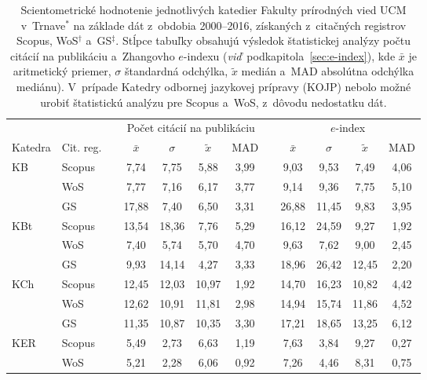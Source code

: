 \begin{table}
  \centering\small
  \caption[Hodnotenie FPV -- počet citácií na publikáciu a~$e$-index]%
  {Scientometrické hodnotenie jednotlivých katedier Fakulty prírodných vied UCM
    v~Trnave$^\ast$ na základe dát z~obdobia 2000--2016, získaných z~citačných
    registrov Scopus, WoS$^\dagger$ a~GS$^\ddagger$.  Stĺpce tabuľky obsahujú
    výsledok štatistickej analýzy počtu citácií na publikáciu a~Zhangovho
    $e$-indexu (\emph{viď}~podkapitola~\ref{sec:e-index}), kde $\bar{x}$ je
    aritmetický priemer, $\sigma$ štandardná odchýlka, $\tilde{x}$ medián a~MAD
    absolútna odchýlka mediánu).  V~prípade Katedry odbornej jazykovej prípravy
    (KOJP) nebolo možné urobiť štatistickú analýzu pre Scopus a~WoS, z~dôvodu
    nedostatku dát.}
  \label{tab:2-staff.results}
  \begin{tabularx}{\textwidth}{XXp{1ex}ccccp{1ex}cccc}
    \toprule
    & & &\multicolumn{4}{c}{Počet citácií na publikáciu} & &\multicolumn{4}{c}{$e$-index} \\
    \cmidrule{4-7}\cmidrule{9-12}
    Katedra  & Cit. reg. & & $\bar{x}$ & $\sigma$  & $\tilde{x}$ & MAD & & $\bar{x}$ & $\sigma$ & $\tilde{x}$  & MAD \\
    \midrule
    KB   & Scopus & & 7,74  & 7,75  & 5,88  & 3,99  & & 9,03  & 9,53  & 7,49  & 4,06  \\
         & WoS    & & 7,77  & 7,16  & 6,17  & 3,77  & & 9,14  & 9,36  & 7,75  & 5,10  \\
         & GS     & & 17,88 & 7,40  & 6,50  & 3,31  & & 26,88 & 11,45 & 9,83  & 3,95  \\[1ex]
    KBt  & Scopus & & 13,54 & 18,36 & 7,76  & 5,29  & & 16,12 & 24,59 & 9,27  & 1,92  \\
         & WoS    & & 7,40  & 5,74  & 5,70  & 4,70  & & 9,63  & 7,62  & 9,00  & 2,45  \\
         & GS     & & 9,93  & 14,14 & 4,27  & 3,33  & & 18,96 & 26,42 & 12,45 & 2,20  \\[1ex]
    KCh  & Scopus & & 12,45 & 12,03 & 10,97 & 1,92  & & 14,70 & 16,23 & 10,82 & 4,42  \\
         & WoS    & & 12,62 & 10,91 & 11,81 & 2,98  & & 14,94 & 15,74 & 11,86 & 4,52  \\
         & GS     & & 11,35 & 10,87 & 10,35 & 3,30  & & 17,21 & 18,65 & 13,25 & 6,12  \\[1ex]
    KER  & Scopus & & 5,49  & 2,73  & 6,63  & 1,19  & & 7,63  & 3,84  & 9,27  & 0,27  \\
         & WoS    & & 5,21  & 2,28  & 6,06  & 0,92  & & 7,26  & 4,46  & 8,31  & 0,75  \\

\end{tabularx}
\end{table}

